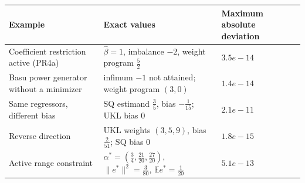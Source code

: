 \begin{tabular}{lll}
\hline
Example & Exact values & Maximum absolute deviation \\
\hline
Coefficient restriction active (PR4a) & $\widehat\beta=1$, imbalance $-2$, weight program $\frac{5}{2}$ & $3.5e-14$ \\
Basu power generator without a minimizer & infimum $-1$ not attained; weight program $(3,0)$ & $1.4e-14$ \\
Same regressors, different bias & SQ estimand $\frac{3}{5}$, bias $- \frac{1}{15}$; UKL bias $0$ & $2.1e-11$ \\
Reverse direction & UKL weights $(3,5,9)$, bias $\frac{2}{51}$; SQ bias $0$ & $1.8e-15$ \\
Active range constraint & $\alpha^*=(\frac{3}{4},\frac{21}{20},\frac{27}{20})$, $\|e^*\|^2=\frac{3}{80}$, $\mathbb{E} e^*=\frac{1}{20}$ & $5.1e-13$ \\
\hline
\end{tabular}
